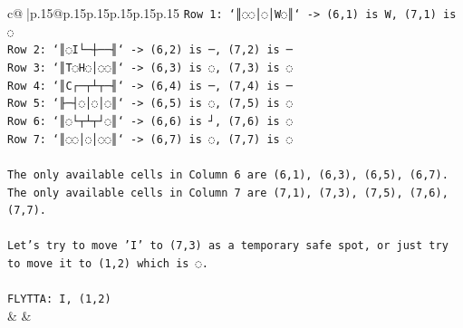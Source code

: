 \documentclass{article}
\begin{document}
{\begin{supertabular}{c@{$\;$}|p{.15\linewidth}@{}p{.15\linewidth}p{.15\linewidth}p{.15\linewidth}p{.15\linewidth}p{.15\linewidth}}
{{{\texttt{Row 1: `║◌◌│◌│W◌║` {-}> (6,1) is W, (7,1) is ◌} \\
\texttt{Row 2: `║◌I└─┼──╢` {-}> (6,2) is ─, (7,2) is ─} \\
\texttt{Row 3: `║T◌H◌│◌◌║` {-}> (6,3) is ◌, (7,3) is ◌} \\
\texttt{Row 4: `║C┌─┬┴┬─╢` {-}> (6,4) is ─, (7,4) is ─} \\
\texttt{Row 5: `╟─┤◌│◌│◌║` {-}> (6,5) is ◌, (7,5) is ◌} \\
\texttt{Row 6: `║◌└┬┴┬┘◌║` {-}> (6,6) is ┘, (7,6) is ◌} \\
\texttt{Row 7: `║◌◌│◌│◌◌║` {-}> (6,7) is ◌, (7,7) is ◌} \\
\\ 
\texttt{The only available cells in Column 6 are (6,1), (6,3), (6,5), (6,7).} \\
\texttt{The only available cells in Column 7 are (7,1), (7,3), (7,5), (7,6), (7,7).} \\
\\ 
\texttt{Let's try to move 'I' to (7,3) as a temporary safe spot, or just try to move it to (1,2) which is ◌.} \\
\\ 
\texttt{FLYTTA: I, (1,2)} \\
            }
        }
    }
    & & \\ \\


\end{supertabular}}
\end{document}
